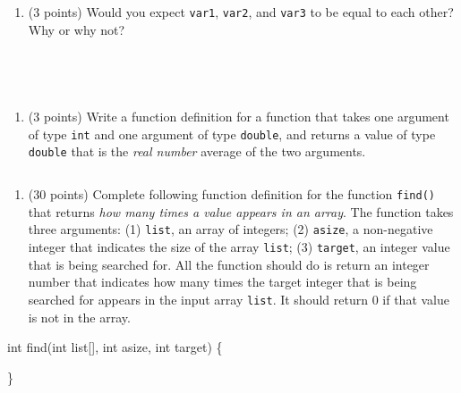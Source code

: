 \documentclass[
]{article}
\newenvironment{Shaded}{}{}
\newcommand{\DataTypeTok}[1]{\textcolor[rgb]{0.56,0.13,0.00}{#1}}
\newcommand{\NormalTok}[1]{#1}
\providecommand{\tightlist}{%
  \setlength{\itemsep}{0pt}\setlength{\parskip}{0pt}}
\begin{document}
\begin{enumerate}
\def\labelenumi{\alph{enumi}.}
\tightlist
\item
  (3 points) Would you expect \texttt{var1}, \texttt{var2}, and
  \texttt{var3} to be equal to each other? Why or why not?
\end{enumerate}

\begin{verbatim}




\end{verbatim}

\begin{enumerate}
\def\labelenumi{\alph{enumi}.}
\setcounter{enumi}{1}
\tightlist
\item
  (3 points) Write a function definition for a function that takes one
  argument of type \texttt{int} and one argument of type
  \texttt{double}, and returns a value of type \texttt{double} that is
  the \emph{real number} average of the two arguments.
\end{enumerate}

\begin{verbatim}
\end{verbatim}

\pagebreak

\begin{enumerate}
\def\labelenumi{\arabic{enumi}.}
\setcounter{enumi}{6}
\tightlist
\item
  (30 points) Complete following function definition for the function
  \texttt{find()} that returns \emph{how many times a value appears in
  an array}. The function takes three arguments: (1) \texttt{list}, an
  array of integers; (2) \texttt{asize}, a non-negative integer that
  indicates the size of the array \texttt{list}; (3) \texttt{target}, an
  integer value that is being searched for. All the function should do
  is return an integer number that indicates how many times the target
  integer that is being searched for appears in the input array
  \texttt{list}. It should return 0 if that value is not in the array.
\end{enumerate}

\begin{Shaded}
\begin{Highlighting}[]
\DataTypeTok{int}\NormalTok{ find(}\DataTypeTok{int}\NormalTok{ list[], }\DataTypeTok{int}\NormalTok{ asize, }\DataTypeTok{int}\NormalTok{ target) \{}





















\NormalTok{\}}
\end{Highlighting}
\end{Shaded}
\end{document}
